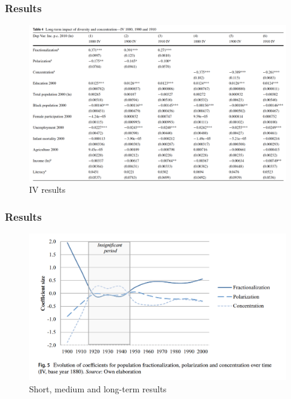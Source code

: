 \documentclass[pdftex,12pt,xcolor=pdftex,table]{beamer}
\begin{document}


\begin{frame}
\frametitle{Results}

\begin{figure}
	\begin{center}
	 \caption{\textmd{IV results}}
	\includegraphics[scale=0.28]{robust.png} 
	\end{center}
\end{figure}


\end{frame}



\begin{frame}
\frametitle{Results}

\begin{figure}
	\begin{center}
	 \caption{\textmd{Short, medium and long-term results}}
	\includegraphics[scale=0.45]{results3.png} 
	\end{center}
\end{figure}


\end{frame}
\end{document}
